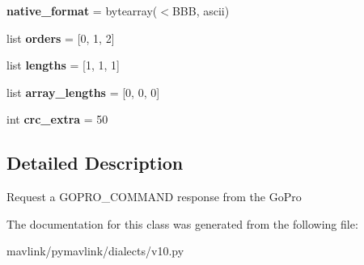 \begin{DoxyCompactItemize}
{\bfseries native\+\_\+format} = bytearray(\textquotesingle{}$<$B\+BB\textquotesingle{}, \textquotesingle{}ascii\textquotesingle{})
\item 
\mbox{\label{classpymavlink_1_1dialects_1_1v10_1_1MAVLink__gopro__get__request__message_a5f2136658d4ae5290dab6aac5b5f54e0}} 
list {\bfseries orders} = \mbox{[}0, 1, 2\mbox{]}
\item 
\mbox{\label{classpymavlink_1_1dialects_1_1v10_1_1MAVLink__gopro__get__request__message_a5e1819a4ef56eaebffc13913920c6185}} 
list {\bfseries lengths} = \mbox{[}1, 1, 1\mbox{]}
\item 
\mbox{\label{classpymavlink_1_1dialects_1_1v10_1_1MAVLink__gopro__get__request__message_a89751064b339a98c73091a899f762b13}} 
list {\bfseries array\+\_\+lengths} = \mbox{[}0, 0, 0\mbox{]}
\item 
\mbox{\label{classpymavlink_1_1dialects_1_1v10_1_1MAVLink__gopro__get__request__message_abd621f03cbfddc7c2b6ea5faa3c38b10}} 
int {\bfseries crc\+\_\+extra} = 50
\end{DoxyCompactItemize}


\subsection{Detailed Description}
\begin{DoxyVerb}Request a GOPRO_COMMAND response from the GoPro
\end{DoxyVerb}
 

The documentation for this class was generated from the following file\+:\begin{DoxyCompactItemize}
\item 
mavlink/pymavlink/dialects/v10.\+py\end{DoxyCompactItemize}
